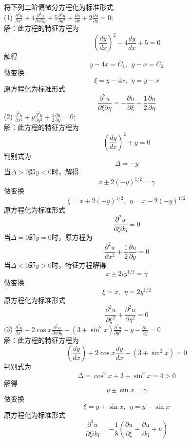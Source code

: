 \documentclass[10pt,a4paper]{article}
\begin{document}
\section{}
将下列二阶偏微分方程化为标准形式.\\
(1) $\frac{\partial^2u}{\partial x^2}+4\frac{\partial^2u}{\partial x\partial y}+5\frac{\partial^2u}{\partial y^2}+\frac{\partial u}{\partial x}+2\frac{\partial u}{\partial y}=0$;\\
解：此方程的特征方程为
\[
(\frac{dy}{dx})^2-4\frac{dy}{dx}+5=0
\]
解得
\[
y-4x=C_1,~~y-x=C_2
\]
做变换
\[
\xi=y-4x,~~\eta=y-x
\]
原方程化为标准形式
\[
\frac{\partial^2u}{\partial\xi\partial\eta}=-\frac{\partial u}{\partial\xi}+\frac{1}{2}\frac{\partial u}{\partial\eta}
\]
(2) $\frac{\partial^2u}{\partial x^2}+y\frac{\partial^2u}{\partial y^2}+\frac{1}{2}\frac{\partial u}{\partial y}=0$;\\
解：此方程的特征方程为
\[
(\frac{dy}{dx})^2+y=0
\]
判别式为
\[
\Delta=-y
\]
当$\Delta>0$即$y<0$时，解得
\[
x\pm2(-y)^{1/2}=\gamma
\]
做变换
\[
\xi=x+2(-y)^{1/2},~~\eta=x-2(-y)^{1/2}
\]
原方程化为标准形式
\[
\frac{\partial^2u}{\partial\xi\partial\eta}=0
\]
当$\Delta=0$即$y=0$时，原方程为
\[
\frac{\partial^2u}{\partial x^2}+\frac{1}{2}\frac{\partial u}{\partial y}=0
\]
当$\Delta<0$即$y>0$时，特征方程解得
\[
x\pm2iy^{1/2}=\gamma
\]
做变换
\[
\xi=x,~~\eta=2y^{1/2}
\]
原方程化为标准形式
\[
\frac{\partial^2u}{\partial\xi^2}+\frac{\partial^2u}{\partial\eta^2}=0
\]
(3) $\frac{\partial^2u}{\partial x^2}-2\cos x\frac{\partial^2u}{\partial x\partial y}-(3+\sin^2x)\frac{\partial^2u}{\partial y^2}-y-\frac{\partial u}{\partial y}=0$\\
解：此方程的特征方程为
\[
(\frac{dy}{dx})+2\cos x\frac{dy}{dx}-(3+\sin^2x)=0
\]
判别式为
\[
\Delta=\cos^2x+3+\sin^2x=4>0
\]
解得
\[
y\pm\sin x=\gamma
\]
做变换
\[
\xi=y+\sin x,~~\eta=y-\sin x
\]
原方程化为标准形式
\[
\frac{\partial^2u}{\partial\xi\partial\eta}=-\frac{1}{8}(\frac{\partial u}{\partial\xi}+\frac{\partial u}{\partial\eta}+u)
\]
\end{document}
